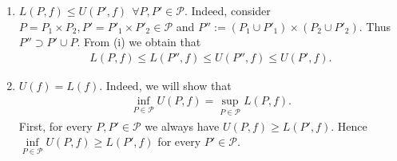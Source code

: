 \begin{problem}
\begin{solution}
\begin{enumerate}
\begin{enumerate}
        \item[(ii)] $L(P,f) \le U(P',f)\ \ \forall P,P'\in\mathcal{P}$. Indeed, consider $P=P_1 \times P_2, P' = P'_1 \times P'_2 \in\mathcal{P}$ and $P'':=(P_1 \cup P'_1) \times (P_2 \cup P'_2)$. Thus $P'' \supset P'\cup P$. From (i) we obtain that 
        \begin{align*}
            L(P,f) \le L(P'',f) \le U(P'',f) \le U(P',f).
        \end{align*}
        \item[(iii)] $U(f) = L(f)$. Indeed, we will show that
        \begin{align*}
            \inf\limits_{P\in \mathcal{P}} U(P,f) = \sup\limits_{P\in \mathcal{P}} L(P,f).
        \end{align*}
        First, for every $P,P'\in\mathcal{P}$ we always have $U(P,f) \ge L(P',f)$. Hence $\inf\limits_{P\in\mathcal{P}} U(P,f) \ge L(P',f)$ for every $P'\in\mathcal{P}$.\\
        

\end{enumerate}
\end{enumerate}
\end{solution}
\end{problem}
